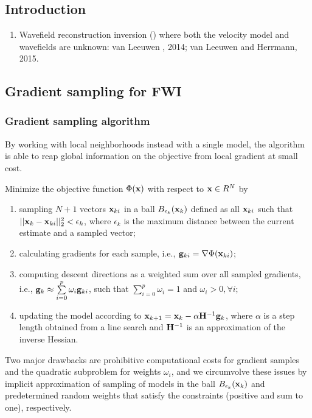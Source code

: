 \renewcommand{\pmk}{Louboutin\_2017\_EAGE\_Gradient sampling algorithm}
\renewcommand{\prf}{FWI/\pmk.pdf}
\renewcommand{\pti}{Extending the Search Space of Time-domain Adjoint-state FWI with Randomized Implicit Time Shifts}
\renewcommand{\pay}{M. Louboutin, F. J. Herrmann, 2017}
\renewcommand{\pjo}{79th EAGE Conference \& Exhibition}
\renewcommand{\pda}{2018/12/5 Wen.}
\section{\pinfo}
\subsection{Introduction}
\begin{enumerate}[\hspace{10mm}*]
  \item Wavefield reconstruction inversion () where both the velocity model and wavefields are unknown: van Leeuwen \etal, 2014; van Leeuwen and Herrmann, 2015.
\end{enumerate}\par
\subsection{Gradient sampling for FWI}
\subsubsection{Gradient sampling algorithm}
By working with local neighborhoods instead with a single model, the algorithm is able to reap global information on the objective from local gradient at small cost.\par
Minimize the objective function $\Phi(\mathbf{x})$ with respect to $\mathbf{x}\in R^N$ by
\begin{enumerate}[\hspace{10mm}$\bullet$]
  \item sampling $N+1$ vectors $\mathbf{x}_{ki}$ in a ball $B_{\epsilon_k}(\mathbf{x}_k)$ defined as all $\mathbf{x}_{ki}$ such that $||\mathbf{x}_k-\mathbf{x}_{ki}||_2^2<\epsilon_k$, where $\epsilon_k$ is the maximum distance between the current estimate and a sampled vector;
  \item calculating gradients for each sample, i.e., $\mathbf{g}_{ki}=\nabla\Phi(\mathbf{x}_{ki})$;
  \item computing descent directions as a weighted sum over all sampled gradients, i.e., $\mathbf{g}_k\approx\sum\limits_{i=0}^p\omega_i\mathbf{g}_{ki}$, such that $\sum\limits_{i=0}^p\omega_i=1$ and $\omega_i>0,\forall i$;
  \item updating the model according to $\mathbf{x}_{k+1}=\mathbf{x}_k-\alpha\mathbf{H}^{-1}\mathbf{g}_k$, where $\alpha$ is a step length obtained from a line search and $\mathbf{H}^{-1}$ is an approximation of the inverse Hessian.
\end{enumerate}\par
Two major drawbacks are prohibitive computational costs for gradient samples and the quadratic subproblem for weights $\omega_i$, and we circumvolve these issues by implicit approximation of sampling of models in the ball $B_{\epsilon_k}(\mathbf{x}_k)$ and predetermined random weights that satisfy the constraints (positive and sum to one), respectively.
